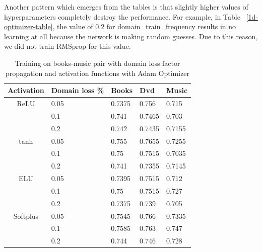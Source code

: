 \documentclass[11pt,a4paper]{article}
\begin{document}
Another pattern which emerges from the tables is that slightly higher values of hyperparameters completely destroy the performance. For example, in Table ~\ref{1d-optimizer-table}, the value of 0.2 for domain\_train\_frequency results in no learning at all because the network is making random guesses. Due to this reason, we did not train RMSprop for this value.

\begin{table}[h]
\begin{center}
\begin{tabular}{|c|l|l|l|l|}
\hline
Activation & \multicolumn{1}{|p{1cm}|}{Domain loss \%}& Books & Dvd & Music \\
\hline
ReLU & 0.05 & 0.7375 & 0.756 & 0.715  \\
 & 0.1 & 0.741 & 0.7465 & 0.703 \\
 & 0.2 & 0.742 & 0.7435 & 0.7155 \\
\hline
tanh & 0.05 & 0.755 & 0.7655 & 0.7255 \\
 & 0.1 & 0.75 & 0.7515 & 0.7035 \\
 & 0.2 & 0.741 & 0.7355 & 0.7145 \\
\hline
ELU & 0.05 & 0.7395 & 0.7515 & 0.712 \\
 & 0.1 & 0.75 & 0.7515 & 0.727 \\
 & 0.2 & 0.7375 & 0.739 & 0.705 \\
\hline
Softplus & 0.05 & 0.7545 & 0.766 & 0.7335 \\
 & 0.1 & 0.7585 & 0.763 & 0.747 \\
 & 0.2 & 0.744 & 0.746 & 0.728 \\
\hline
\end{tabular}
\end{center}
\caption{ Training on books-music pair with domain loss factor propagation and activation functions with Adam Optimizer}
\label{alpha-activation-table}
\end{table}
\end{document}
